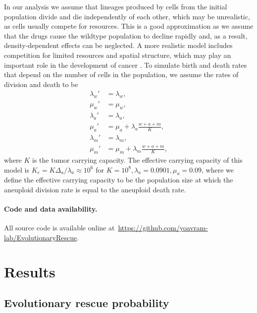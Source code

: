 \documentclass[12pt]{extarticle}
\begin{document}
In our analysis we assume that lineages produced by cells from the initial population divide and die independently of each other, which may be unrealistic, as cells usually compete for resources. This is a good approximation as we assume that the drugs cause the wildtype population to decline rapidly and, as a result, density-dependent effects can be neglected.
A more realistic model includes competition for limited resources and spatial structure, which may play an important role in the development of cancer \citep[e.g.,][]{martens2011spatial}.
To simulate birth and death rates that depend on the number of cells in the population, we assume the rates of division and death to be
\begin{align*}
\lambda_w' &= \lambda_w , \\
\mu_w' &= \mu_w ,\\
\lambda_a' &= \lambda_a ,\\ 
\mu_a' &= \mu_a + \lambda_a\frac{w+a+m}{K} ,\\
\lambda_m' &= \lambda_m ,\\ 
\mu_m' &= \mu_m + \lambda_m\frac{w+a+m}{K} ,
\end{align*}
where $K$ is the tumor carrying capacity. 
The effective carrying capacity of this model is $K_e=K\Delta_a/\lambda_a\approx10^6$ for $K=10^8, \lambda_a=0.0901,\mu_a=0.09$, where we define the effective carrying capacity to be the population size at which the aneuploid division rate is equal to the aneuploid death rate. 


\paragraph{Code and data availability.} All source code is available online at~\url{https://github.com/yoavram-lab/EvolutionaryRescue}.


\section*{Results}


\subsection*{Evolutionary rescue probability}
\end{document}
